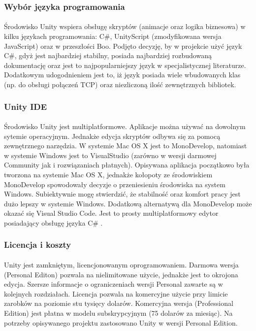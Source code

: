 \subsubsection{Wybór języka programowania}
\paragraph{}
Środowisko Unity wspiera obsługę skryptów (animacje oraz logika biznesowa) w kilku językach programowania: C\#, UnityScript (zmodyfikowana wersja JavaScript)  oraz w przeszłości Boo. Podjęto decyzję, by w projekcie użyć język C\#, gdyż jest najbardziej stabilny, posiada najbardziej rozbudowaną dokumentację oraz jest to najpopularniejszy język w specjalistycznej literaturze. Dodatkowym udogodnieniem  jest to, iż  język posiada wiele wbudowanych klas (np. do obsługi połączeń TCP) oraz niezliczoną ilość zewnętrznych bibliotek.
\subsubsection{Unity IDE}
\paragraph{}
Środowisko Unity jest multiplatformowe. Aplikacje można używać na dowolnym sytemie operacyjnym. Jednakże edycja skryptów odbywa się za pomocą zewnętrznego narzędzia. W systemie Mac OS X jest to MonoDevelop, natomiast w systemie Windows jest to VisualStudio (zarówno w wersji darmowej Community jak i rozwiązaniach płatnych). Opisywana aplikacja początkowo była tworzona na systemie Mac OS X, jednakże kołopoty ze środowiskiem MonoDevelop spowodowały decyzje o przeniesieniu środowiska na system Windows. Subiektywnie mogę stwierdzić, że stabilność oraz komfort pracy jest dużo lepszy w systemie Windows.
Dodatkową alternatywą dla MonoDevelop może okazać się Visual Studio Code. Jest to prosty multiplatformowy edytor posiadający obsługę języka C\# .

\subsubsection{Licencja i koszty}
\paragraph{}
Unity jest zamkniętym, licencjonowanym oprogramowaniem. Darmowa wersja (Personal Editon) pozwala na nielimitowane użycie, jednakże jest to okrojona edycja. Szersze informacje o ograniczeniach wersji Personal zawarte są w kolejnych rozdziałach. Licencja pozwala na komercyjne użycie przy limicie zarobków na poziomie stu tysięcy dolarów.
Komercyjna wersja (Professional Edition) jest płatna w modelu subskrypcyjnym (75 dolarów za miesiąc)\cite{unity1}.
Na potrzeby opisywanego projektu zastosowano Unity w wersji Personal Edition.

